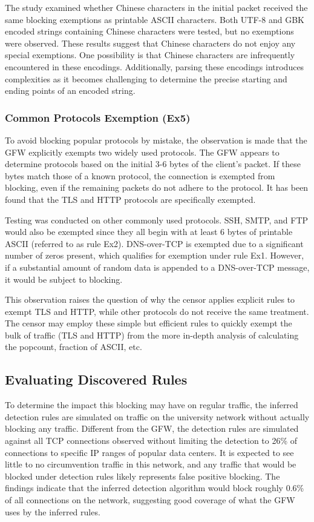 The study examined whether Chinese characters in the initial packet received the same blocking exemptions as printable ASCII characters. Both UTF-8 and GBK encoded strings containing Chinese characters were tested, but no exemptions were observed. These results suggest that Chinese characters do not enjoy any special exemptions. One possibility is that Chinese characters are infrequently encountered in these encodings. Additionally, parsing these encodings introduces complexities as it becomes challenging to determine the precise starting and ending points of an encoded string.

\subsubsection{\textbf{Common Protocols Exemption (Ex5)}}
To avoid blocking popular protocols by mistake, the observation is made that the GFW explicitly exempts two widely used protocols. The GFW appears to determine protocols based on the initial 3-6 bytes of the client's packet. If these bytes match those of a known protocol, the connection is exempted from blocking, even if the remaining packets do not adhere to the protocol. It has been found that the TLS and HTTP protocols are specifically exempted.

Testing was conducted on other commonly used protocols. SSH, SMTP, and FTP would also be exempted since they all begin with at least 6 bytes of printable ASCII (referred to as rule Ex2). DNS-over-TCP is exempted due to a significant number of zeros present, which qualifies for exemption under rule Ex1. However, if a substantial amount of random data is appended to a DNS-over-TCP message, it would be subject to blocking.

This observation raises the question of why the censor applies explicit rules to exempt TLS and HTTP, while other protocols do not receive the same treatment. The censor may employ these simple but efficient rules to quickly exempt the bulk of traffic (TLS and HTTP) from the more in-depth analysis of calculating the popcount, fraction of ASCII, etc.

\subsection{Evaluating Discovered Rules}
To determine the impact this blocking may have on regular traffic, the inferred detection rules are simulated on traffic on the university network without actually blocking any traffic. Different from the GFW, the detection rules are simulated against all TCP connections observed without limiting the detection to 26\% of connections to specific IP ranges of popular data centers. It is expected to see little to no circumvention traffic in this network, and any traffic that would be blocked under detection rules likely represents false positive blocking. The findings indicate that the inferred detection algorithm would block roughly 0.6\% of all connections on the network, suggesting good coverage of what the GFW uses by the inferred rules.

